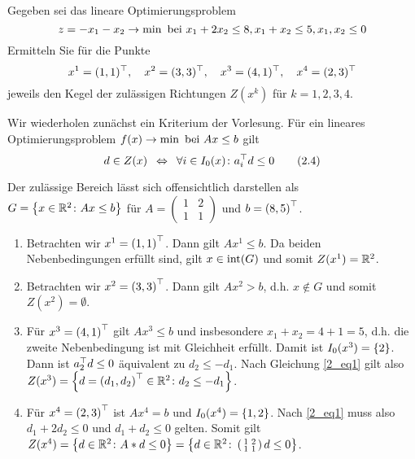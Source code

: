 \begin{exercisePage}
%
\begin{homework}
	Gegeben sei das lineare Optimierungsproblem
	\begin{equation*}
		z = -x_1 - x_2 \to \min \text{ bei } x_1 + 2x_2 \le 8, x_1 + x_2 \le 5, x_1, x_2 \le 0
	\end{equation*}
	Ermitteln Sie für die Punkte
	\begin{equation*}
		x^1 = (1, 1)^{\top}, \quad x^2 = (3, 3)^{\top}, \quad x^3 = (4, 1)^{\top}, \quad x^4 = (2, 3)^{\top}
	\end{equation*}
	jeweils den Kegel der zulässigen Richtungen $Z(x^k)$ für $k = 1,2,3,4$.
\end{homework}

Wir wiederholen zunächst ein Kriterium der Vorlesung. Für ein lineares Optimierungsproblem $f(x) \to \min \text{ bei } Ax \le b$ gilt
\begin{equation*}
	d \in Z(x) \enskip \Leftrightarrow \enskip \forall i \in I_0(x) \colon a_i^{\top} d \le 0 \tag{2.4} \label{2_eq1}
\end{equation*}

Der zulässige Bereich lässt sich offensichtlich darstellen als $G = \left\{ x \in \mathbb{R}^2 \colon Ax \le b \right\}$ für $A = \left( \begin{smallmatrix} 1 & 2 \\ 1 & 1 \end{smallmatrix} \right)$ und $b = \left( 8, 5 \right)^{\top}$. 
\begin{enumerate}[label=(\roman*), leftmargin=*]
	\item Betrachten wir $x^1 = \left( 1,1 \right)^{\top}$. Dann gilt $Ax^1 \le b$. Da beiden Nebenbedingungen erfüllt sind, gilt $x \in \operatorname{int}(G)$ und somit $Z(x^1) = \mathbb{R}^2$.
	\item Betrachten wir $x^2 = \left( 3,3 \right)^{\top}$. Dann gilt $Ax^2 > b$, d.h. $x \notin G$ und somit $Z(x^2) = \emptyset$.
	\item Für $x^3 = \left( 4,1 \right)^{\top}$ gilt $Ax^3 \le b$ und insbesondere $x_1 + x_2 = 4 + 1 = 5$, d.h. die zweite Nebenbedingung ist mit Gleichheit erfüllt. Damit ist $I_0(x^3) = \left\{ 2 \right\}$. Dann ist $a_2^{\top} d \le 0$ äquivalent zu $d_2 \le - d_1$. Nach Gleichung \eqref{2_eq1} gilt also $Z(x^3) = \left\{ d = \left( d_1,d_2 \right)^{\top} \in \mathbb{R}^2 \colon d_2 \le - d_1 \right\}$.
	\item Für $x^4 = \left( 2,3 \right)^{\top}$ ist $Ax^4 = b$ und $I_0(x^4) = \left\{ 1,2 \right\}$. Nach \eqref{2_eq1} muss also $d_1 + 2d_2 \le 0$ und $d_1 + d_2 \le 0$ gelten. Somit gilt $Z(x^4) = \left\{ d \in \mathbb{R}^2 \colon A * d \le 0 \right\}
	= \left\{ d \in \mathbb{R}^2 \colon \left( \begin{smallmatrix} 1 & 2 \\ 1 & 1 \end{smallmatrix} \right) d \le 0 \right\}$. 
\end{enumerate}


\end{exercisePage}
